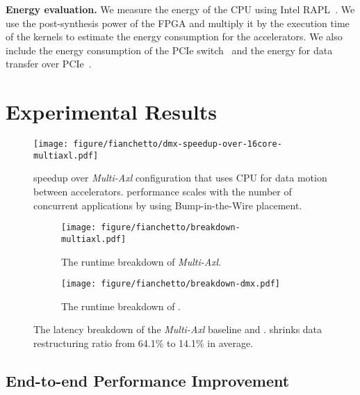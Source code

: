\noindent \textbf{Energy evaluation.}
We measure the energy of the CPU using Intel RAPL~\cite{intel-rapl}. We use the post-synthesis power of the FPGA and multiply it by the execution time of the kernels to estimate the energy consumption for the accelerators. We also include the energy consumption of the PCIe switch~\cite{broadcom:pcie-switches} and the energy for data transfer over PCIe~\cite{zeppelin:isscc:2018}.


\section{Experimental Results} 
\label{sec:results}

\begin{figure}[ht!]
    \centering
    \texttt{[image: figure/fianchetto/dmx-speedup-over-16core-multiaxl.pdf]}
    \caption{\dmx speedup over \emph{Multi-Axl} configuration that uses CPU for data motion between accelerators. \dmx performance scales with the number of concurrent applications by using Bump-in-the-Wire \drx placement.
    }
    \label{fig:res:speedup}
\end{figure}

\begin{figure}[t!]
%
\begin{subfigure}[ht!]{\columnwidth}
\texttt{[image: figure/fianchetto/breakdown-multiaxl.pdf]}
\caption{The runtime breakdown of \emph{Multi-Axl}.}
\label{fig:res:breakdown-multiaxl}
\end{subfigure}
%
\begin{subfigure}[t!]{\columnwidth}
\texttt{[image: figure/fianchetto/breakdown-dmx.pdf]}
\caption{The runtime breakdown of \dmx.}
\label{fig:res:breakdown-dmx}
\end{subfigure}
%
\caption{The latency breakdown of the \emph{Multi-Axl} baseline and \dmx. \dmx shrinks data restructuring ratio from 64.1\% to 14.1\% in average.}
\label{fig:res:breakdown}
\end{figure}

\subsection{End-to-end Performance Improvement} 
\label{sec:results:e2e_metrics}

